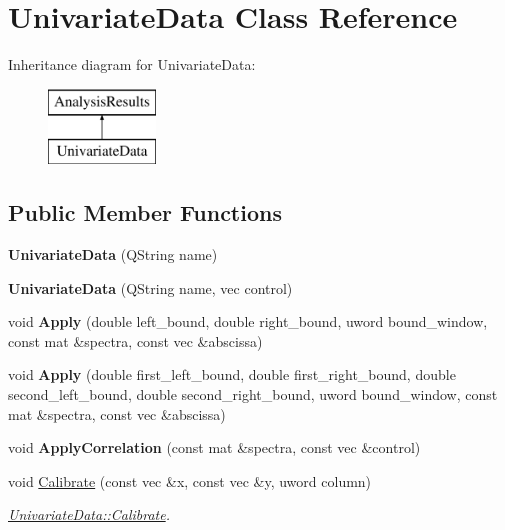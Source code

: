 \hypertarget{class_univariate_data}{}\section{Univariate\+Data Class Reference}
\label{class_univariate_data}
Inheritance diagram for Univariate\+Data\+:\begin{figure}[H]
\begin{center}
\leavevmode
\includegraphics[height=2.000000cm]{class_univariate_data}
\end{center}
\end{figure}
\subsection*{Public Member Functions}
\begin{DoxyCompactItemize}
\item 
{\bfseries Univariate\+Data} (Q\+String name)\hypertarget{class_univariate_data_a2e1398e3e33f9eb1db9e992b9d7c09e6}{}\label{class_univariate_data_a2e1398e3e33f9eb1db9e992b9d7c09e6}

\item 
{\bfseries Univariate\+Data} (Q\+String name, vec control)\hypertarget{class_univariate_data_a7065e615e2b39bba4ddc473bd528cf39}{}\label{class_univariate_data_a7065e615e2b39bba4ddc473bd528cf39}

\item 
void {\bfseries Apply} (double left\+\_\+bound, double right\+\_\+bound, uword bound\+\_\+window, const mat \&spectra, const vec \&abscissa)\hypertarget{class_univariate_data_ae024c16e1dfa13d611283fc7becbe692}{}\label{class_univariate_data_ae024c16e1dfa13d611283fc7becbe692}

\item 
void {\bfseries Apply} (double first\+\_\+left\+\_\+bound, double first\+\_\+right\+\_\+bound, double second\+\_\+left\+\_\+bound, double second\+\_\+right\+\_\+bound, uword bound\+\_\+window, const mat \&spectra, const vec \&abscissa)\hypertarget{class_univariate_data_a8b9aabe1e50413def43d0c0f4209a4b2}{}\label{class_univariate_data_a8b9aabe1e50413def43d0c0f4209a4b2}

\item 
void {\bfseries Apply\+Correlation} (const mat \&spectra, const vec \&control)\hypertarget{class_univariate_data_ac3ddd18ba99ac2b3b4ae94c980256bfa}{}\label{class_univariate_data_ac3ddd18ba99ac2b3b4ae94c980256bfa}

\item 
void \hyperlink{class_univariate_data_af2de4faeec3c078db3e7879dea0026c9}{Calibrate} (const vec \&x, const vec \&y, uword column)
\begin{DoxyCompactList}\small\item\em \hyperlink{class_univariate_data_af2de4faeec3c078db3e7879dea0026c9}{Univariate\+Data\+::\+Calibrate}. \end{DoxyCompactList}\end{DoxyCompactItemize}


